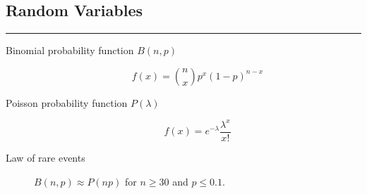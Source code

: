 \documentclass[a4paper, 10pt]{article}
\begin{document}
\subsection*{\sffamily Random Variables}
\begin{multicols}{2}
\begin{tcolorbox}[hbox, title=Discrete]
\begin{varwidth}{0.4\textwidth}
	\rule{\textwidth}{0pt}
	\begin{description}
		\item [Binomial probability function $B(n,p)$]
		\[f(x)=\binom{n}{x}p^x (1-p)^{n-x}\]
		\item [Poisson probability function $P(\lambda)$]
		\[f(x)=e^{-\lambda}\frac{\lambda^x}{x!}\]
		\item [Law of rare events] $B(n,p)\approx P(np)$ for $n\geq 30$ and $p\leq 0.1$.
	\end{description}
\end{varwidth}
\end{tcolorbox}

\end{multicols}
\end{document}
